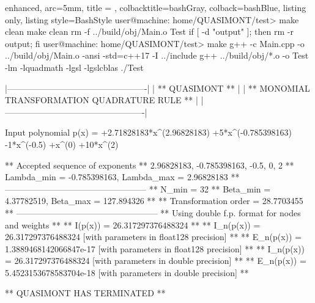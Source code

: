 \documentclass[a4paper, twosided]{book}
\begin{document}
\newpage 

\begin{tcblisting}{enhanced,
                   arc=5mm,
                   title = \color{black}{\large \ttfamily Building and executing the test driver: p\_1(x)},
                   colbacktitle=bashGray,
                   colback=bashBlue,
                   listing only,
                   listing style=BashStyle}
user@machine: home/QUASIMONT/test> make clean
make clean
rm -f ../build/obj/Main.o Test
if [ -d "output" ]; then rm -r output; fi
user@machine: home/QUASIMONT/test> make
g++ -c Main.cpp -o ../build/obj/Main.o -ansi -std=c++17 -I ../include
g++ ../build/obj/*.o -o Test -lm -lquadmath -lgsl -lgslcblas
./Test

    |-------------------------------------------------|
    |                 ** QUASIMONT **                 |
    |  ** MONOMIAL TRANSFORMATION QUADRATURE RULE **  |
    |-------------------------------------------------|

 Input polynomial p(x) =  +2.71828183*x^(2.96828183) +5*x^(-0.785398163) -1*x^(-0.5) +x^(0)  +10*x^(2)

 ** Accepted sequence of exponents ** 
    {2.96828183, -0.785398163, -0.5, 0, 2}
 ** Lambda_min = -0.785398163, Lambda_max = 2.96828183 **
 --------------------------------------------------
 ** N_min = 32
 ** Beta_min = 4.37782519, Beta_max = 127.894326 **
 ** Transformation order = 28.7703455 **
 --------------------------------------------------
 ** Using double f.p. format for nodes and weights **
 ** I(p(x))   = 26.317297376488324 **
 ** I_n(p(x)) = 26.317297376488324      [with parameters in float128 precision] **
 ** E_n(p(x)) = 1.3889468142066847e-17  [with parameters in float128 precision] **
 ** I_n(p(x)) = 26.317297376488324      [with parameters in double precision] **
 ** E_n(p(x)) = 5.4523153678583704e-18  [with parameters in double precision] **

 ** QUASIMONT HAS TERMINATED **
\end{tcblisting}
\vspace{0.15cm}
\end{document}
